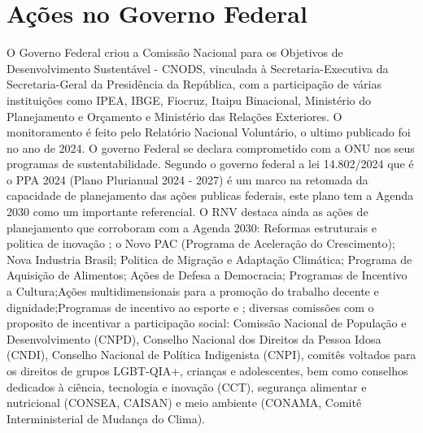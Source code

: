 \section{Ações no Governo Federal}
O Governo Federal criou a  Comissão Nacional para os Objetivos de Desenvolvimento Sustentável - CNODS, vinculada à Secretaria-Executiva da Secretaria-Geral da Presidência da República, com a participação de várias instituições como IPEA, IBGE, Fiocruz, Itaipu Binacional, Ministério do Planejamento e Orçamento e Ministério das Relações Exteriores.
O monitoramento é feito pelo  Relatório Nacional Voluntário, o ultimo publicado foi no ano de 2024.
O governo Federal se declara comprometido  com a ONU nos seus programas de sustentabilidade.
Segundo o governo federal a lei 14.802/2024 que é o PPA 2024 (Plano Plurianual 2024 - 2027) é um marco na retomada da capacidade de planejamento das ações publicas federais, este plano tem a Agenda 2030 como um importante referencial.
O RNV destaca ainda as ações de planejamento que corroboram com a Agenda 2030: Reformas estruturais e politica de inovação ; o Novo PAC (Programa de Aceleração do Crescimento); Nova Industria Brasil; Politica de Migração e Adaptação Climática; Programa de Aquisição de Alimentos; Ações de Defesa a Democracia; Programas de Incentivo a Cultura;Ações multidimensionais para a promoção do trabalho decente e dignidade;Programas de incentivo ao esporte e ; diversas comissões com o proposito de incentivar a participação social: Comissão Nacional de População e Desenvolvimento (CNPD), Conselho Nacional dos Direitos da Pessoa Idosa (CNDI), Conselho Nacional de Política Indigenista (CNPI), comitês voltados para os direitos de grupos LGBT-QIA+, crianças e adolescentes, bem como conselhos dedicados à ciência, tecnologia e inovação (CCT), segurança alimentar e nutricional (CONSEA, CAISAN) e meio ambiente (CONAMA, Comitê Interministerial de Mudança do Clima).
